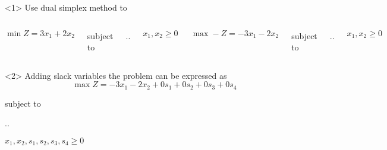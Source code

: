 \begin{frameExample}{\label{example:6.2-2}}{}
  \begin{onlyenv}<1>
    Use dual simplex method to
    \begin{columns}[t]
       \[\min Z = 3x_1 + 2x_2 \] 

       {\centering
         subject to%
         \vspace{3mm}
         
        \sysdelim..%

        \vspace{3mm}
        $x_1, x_2 \geq 0$
      \par}
      
    \[\max -Z = -3x_1 -2x_2 \]

    {\centering
      subject to
      \vspace{3mm}
      
        \sysdelim..%

        \vspace{3mm}
        $x_1, x_2 \geq 0$
      \par}
    \end{columns}
  \end{onlyenv}

  \begin{onlyenv}<2>
    Adding slack variables the problem can be expressed as \[\max Z = -3x_1 -2x_2 + 0s_1 + 0s_2 + 0s_3 + 0s_4\]

        {\centering
      subject to
      \vspace{3mm}
      
        \sysdelim..%

        \vspace{3mm}
        $x_1, x_2,s_1,s_2,s_3,s_4 \geq 0$
        \par}
      
    \end{onlyenv}


\end{frameExample}
